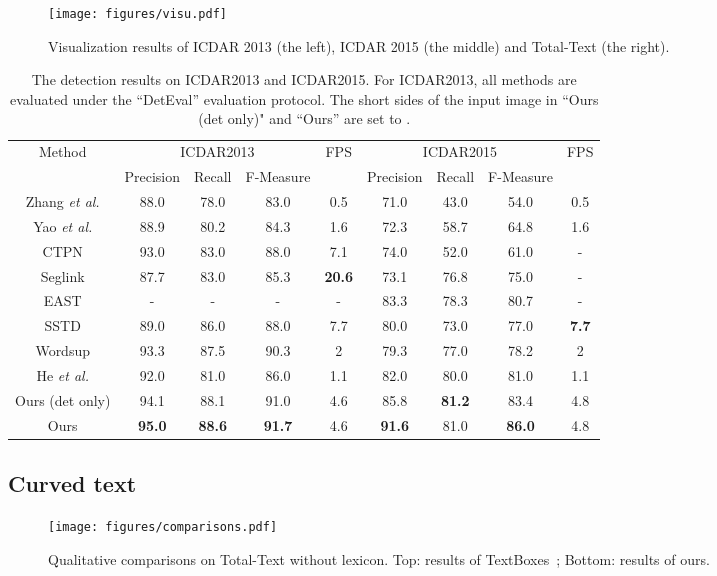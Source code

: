 \documentclass[runningheads]{llncs}
\begin{document}
\begin{figure}[!tbp]
\begin{center}
\texttt{[image: figures/visu.pdf]}
\end{center}
\caption{Visualization results of ICDAR 2013 (the left), ICDAR 2015 (the middle) and Total-Text (the right).}
\label{fig:visu}
\end{figure}


\begin{table}[ht]
\begin{centering}
\caption{The detection results on ICDAR2013 and ICDAR2015. For ICDAR2013, all methods are evaluated  under the ``DetEval” evaluation protocol. The short sides of the input image in ``Ours (det only)" and ``Ours'' are set to .}
\label{tab_detection}
\begin{tabular}{|c|c|c|c|c|c|c|c|c|}
\hline 
\multirow{2}{*}{Method} & \multicolumn{3}{c|}{ICDAR2013} & \multirow{2}{*}{FPS} & \multicolumn{3}{c|}{ICDAR2015} & \multirow{2}{*}{FPS}\tabularnewline
\cline{2-4} \cline{6-8} 
 & Precision & Recall & F-Measure &  & Precision & Recall & F-Measure & \tabularnewline
\hline 
\hline
Zhang \emph{et al.} \cite{zhang2016multi} & 88.0 & 78.0 & 83.0 & 0.5 & 71.0 & 43.0 &  54.0 & 0.5 \tabularnewline
\hline 
Yao \emph{et al.} \cite{yao2016scene} & 88.9 & 80.2 & 84.3 & 1.6 & 72.3 & 58.7 & 64.8 & 1.6  \tabularnewline
\hline 
CTPN \cite{tian2016detecting} & 93.0 & 83.0  & 88.0 & 7.1 & 74.0 & 52.0 & 61.0 & -  \tabularnewline
\hline 
Seglink \cite{shi2017detecting} & 87.7 & 83.0 & 85.3  & \textbf{20.6} & 73.1 & 76.8 & 75.0 & - \tabularnewline
\hline 
EAST \cite{zhou2017east} & - & - & - & - & 83.3 & 78.3 & 80.7 & -   \tabularnewline
\hline 
SSTD \cite{he2017single} & 89.0 & 86.0  & 88.0 & 7.7 & 80.0 & 73.0 &  77.0 & \textbf{7.7} \tabularnewline
\hline 
Wordsup \cite{hu2017wordsup} & 93.3 & 87.5 & 90.3 & 2 & 79.3 & 77.0 & 78.2 & 2  \tabularnewline
\hline 
He \emph{et al.} \cite{he2017deep} & 92.0 & 81.0 & 86.0 & 1.1 & 82.0 & 80.0 & 81.0 & 1.1 \tabularnewline
\hline 
\hline
Ours (det only) &94.1  &88.1  &91.0  &4.6   &85.8   &\textbf{81.2}  &83.4  &4.8 \tabularnewline
\hline 
Ours &\textbf{95.0}  &\textbf{88.6}  &\textbf{91.7}  &4.6   &\textbf{91.6}  &81.0  &\textbf{86.0} &4.8 \tabularnewline
\hline
\end{tabular}
\par\end{centering}
\end{table}

\subsection{Curved text}
\begin{figure}[!tp]
\begin{center}
\texttt{[image: figures/comparisons.pdf]}
\end{center}
\caption{Qualitative comparisons on Total-Text without lexicon. Top: results of TextBoxes~\cite{liao2017textboxes}; Bottom: results of ours.}
\label{fig:visu_compare}
\end{figure}
\end{document}
